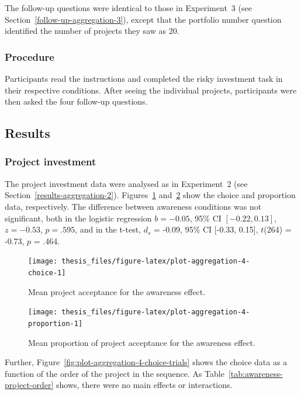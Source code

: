 \documentclass[a4paper, nobind, dvipsnames]{templates/ociamthesis}
\theoremstyle{definition}
\theoremstyle{definition}
\theoremstyle{definition}
\theoremstyle{definition}
\theoremstyle{remark}
\begin{document}
The follow-up questions were identical to those in Experiment~3 (see
Section~\ref{follow-up-aggregation-3}), except that the portfolio number
question identified the number of projects they saw as 20.

\subsubsection{Procedure}

Participants read the instructions and completed the risky investment task in
their respective conditions. After seeing the individual projects, participants
were then asked the four follow-up questions.

\subsection{Results}

\subsubsection{Project investment}

The project investment data were analysed as in Experiment~2 (see
Section~\ref{results-aggregation-2}).
Figures~\ref{fig:plot-aggregation-4-choice}
and~\ref{fig:plot-aggregation-4-proportion} show the choice and proportion
data, respectively. The difference between awareness conditions was not
significant, both in the logistic regression
\(b = -0.05\), 95\% CI \([-0.22, 0.13]\), \(z = -0.53\), \(p = .595\), and in the t-test,
\(d_s\) = -0.09, 95\% CI {[}-0.33, 0.15{]}, \(t\)(264) = -0.73, \(p\) = .464.



\begin{figure}
\texttt{[image: thesis\_files/figure-latex/plot-aggregation-4-choice-1]} \caption{Mean project acceptance for the awareness effect.}\label{fig:plot-aggregation-4-choice}
\end{figure}



\begin{figure}
\texttt{[image: thesis\_files/figure-latex/plot-aggregation-4-proportion-1]} \caption{Mean proportion of project acceptance for the awareness effect.}\label{fig:plot-aggregation-4-proportion}
\end{figure}

Further, Figure~\ref{fig:plot-aggregation-4-choice-trials} shows the choice
data as a function of the order of the project in the sequence. As
Table~\ref{tab:awareness-project-order} shows, there were no main effects or
interactions.
\end{document}

